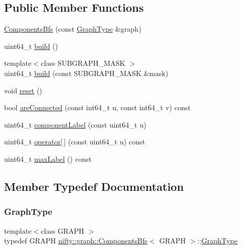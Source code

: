\subsection*{Public Member Functions}
\begin{DoxyCompactItemize}
\item 
\hyperlink{classnifty_1_1graph_1_1ComponentsBfs_a90003a691312b18648f12b1f0795e583}{Components\+Bfs} (const \hyperlink{classnifty_1_1graph_1_1ComponentsBfs_a8122d3bba657eeae191a63ea83bfaba9}{Graph\+Type} \&graph)
\item 
uint64\+\_\+t \hyperlink{classnifty_1_1graph_1_1ComponentsBfs_ac0190ac005f86f02b5e5a32abdfb97c5}{build} ()
\item 
{\footnotesize template$<$class S\+U\+B\+G\+R\+A\+P\+H\+\_\+\+M\+A\+SK $>$ }\\uint64\+\_\+t \hyperlink{classnifty_1_1graph_1_1ComponentsBfs_afb7115a59f27fb30906f91dc415e2c5b}{build} (const S\+U\+B\+G\+R\+A\+P\+H\+\_\+\+M\+A\+SK \&mask)
\item 
void \hyperlink{classnifty_1_1graph_1_1ComponentsBfs_a5f606101cb777ed110a4c1ea0ab25139}{reset} ()
\item 
bool \hyperlink{classnifty_1_1graph_1_1ComponentsBfs_a143c2a8363329880698db2a21968df5c}{are\+Connected} (const int64\+\_\+t u, const int64\+\_\+t v) const
\item 
uint64\+\_\+t \hyperlink{classnifty_1_1graph_1_1ComponentsBfs_a00ef0fcd3715ca79a1f2720ff9998655}{component\+Label} (const uint64\+\_\+t u)
\item 
uint64\+\_\+t \hyperlink{classnifty_1_1graph_1_1ComponentsBfs_a88fa91de836b0107b1ce748f37a69bb8}{operator\mbox{[}$\,$\mbox{]}} (const uint64\+\_\+t u) const
\item 
uint64\+\_\+t \hyperlink{classnifty_1_1graph_1_1ComponentsBfs_a0f6ca2e2c1494a5521bc6940b06446bf}{max\+Label} () const
\end{DoxyCompactItemize}


\subsection{Member Typedef Documentation}
\mbox{\label{classnifty_1_1graph_1_1ComponentsBfs_a8122d3bba657eeae191a63ea83bfaba9}} 
\subsubsection{\texorpdfstring{Graph\+Type}{GraphType}}
{\footnotesize\ttfamily template$<$class G\+R\+A\+PH $>$ \\
typedef G\+R\+A\+PH \hyperlink{classnifty_1_1graph_1_1ComponentsBfs}{nifty\+::graph\+::\+Components\+Bfs}$<$ G\+R\+A\+PH $>$\+::\hyperlink{classnifty_1_1graph_1_1ComponentsBfs_a8122d3bba657eeae191a63ea83bfaba9}{Graph\+Type}}

